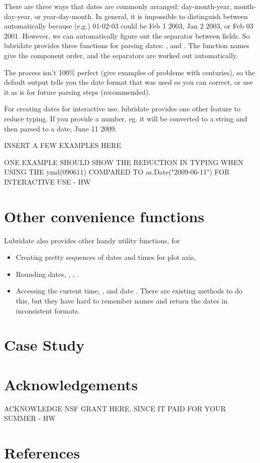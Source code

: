 \documentclass[article]{jss}
\begin{document}
There are three ways that dates are commonly arranged: day-month-year, month-day-year, or year-day-month. In general, it is impossible to distinguish between automatically because (e.g.) 01-02-03 could be Feb 1 2003, Jan 2 2003, or Feb 03 2001.  However, we can automatically figure out the separator between fields.  So lubridate provides three functions for parsing dates: ,  and .  The function names give the component order, and the separators are worked out automatically.  

The process isn't 100\% perfect (give examples of problems with centuries), so the default output tells you the date format that was used so you can correct, or use it as is for future parsing steps (recommended).

For creating dates for interactive use, lubridate provides one other feature to reduce typing.  If you provide a number, eg.  it will be converted to a string  and then parsed to a date, June 11 2009.  

INSERT A FEW EXAMPLES HERE

ONE EXAMPLE SHOULD SHOW THE REDUCTION IN TYPING WHEN USING THE ymd(090611) COMPARED TO as.Date("2009-06-11") FOR INTERACTIVE USE - HW


% 

\section{Other convenience functions}
\label{sec:utils}

Lubridate also provides other handy utility functions, for

\begin{itemize}
  \item Creating pretty sequences of dates and times for plot axis, 
  
  \item Rounding dates, , , .

  \item Accessing the current time, , and date .  There are existing methods to do this, but they have hard to remember names and return the dates in inconsistent formats.
  
\end{itemize}

\section{Case Study}

\section*{Acknowledgements}

ACKNOWLEDGE NSF GRANT HERE, SINCE IT PAID FOR YOUR SUMMER - HW

\section*{References}
\end{document}
